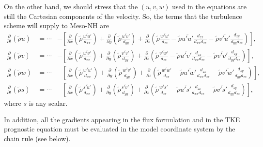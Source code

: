 On the other hand, we should stress that the $(u,v,w)$ used in the equations
are still the Cartesian components of the velocity.
So, the terms that the turbulence scheme will supply to Meso-NH are
\begin{eqnarray}
\frac{\partial }{\partial t}(\tilde{\rho}u)&=
\cdots&-\left[\frac{\partial}{\partial \overline{x}}(\tilde{\rho}
\frac{\overline{u'u'}}{d_{xx}})+\frac{\partial}{\partial \overline{y}}(\tilde
{\rho}\frac{\overline{u'v'}}{d_{yy}})+
\frac{\partial}{\partial \overline{z}}(\tilde{\rho}\frac{\overline{w'u'}}
{d_{zz}}-\tilde{\rho}\overline{u'u'}\frac{d_{zx}}{d_{xx}d_{zz}}
-\tilde{\rho}\overline{v'u'}\frac{d_{zy}}{d_{yy}d_{zz}}) \right ],\nonumber\\
\frac{\partial }{\partial t}(\tilde{\rho}v)&=
\cdots&-\left[\frac{\partial}{\partial \overline{x}}(\tilde{\rho}
\frac{\overline{u'v'}}{d_{xx}})+\frac{\partial}{\partial \overline{y}}(\tilde
{\rho}\frac{\overline{v'v'}}{d_{yy}})+
\frac{\partial}{\partial \overline{z}}(\tilde{\rho}\frac{\overline{v'w'}}
{d_{zz}}-\tilde{\rho}\overline{u'v'}\frac{d_{zx}}{d_{xx}d_{zz}}
-\tilde{\rho}\overline{v'v'}\frac{d_{zy}}{d_{yy}d_{zz}}) \right ],\nonumber\\
\frac{\partial }{\partial t}(\tilde{\rho}w)&=
\cdots&-\left[\frac{\partial}{\partial \overline{x}}(\tilde{\rho}
\frac{\overline{w'u'}}{d_{xx}})+\frac{\partial}{\partial \overline{y}}(\tilde
{\rho}\frac{\overline{w'v'}}{d_{yy}})+
\frac{\partial}{\partial \overline{z}}(\tilde{\rho}\frac{\overline{w'w'}}
{d_{zz}}-\tilde{\rho}\overline{u'w'}\frac{d_{zx}}{d_{xx}d_{zz}}
-\tilde{\rho}\overline{v'w'}\frac{d_{zy}}{d_{yy}d_{zz}}) \right ],\nonumber \\
\frac{\partial }{\partial t}(\tilde{\rho}s)&=
\cdots&-\left[\frac{\partial}{\partial \overline{x}}(\tilde{\rho}
\frac{\overline{s'u'}}{d_{xx}})+\frac{\partial}{\partial \overline{y}}(\tilde
{\rho}\frac{\overline{s'v'}}{d_{yy}})+
\frac{\partial}{\partial \overline{z}}(\tilde{\rho}\frac{\overline{w's'}}
{d_{zz}}-\tilde{\rho}\overline{u's'}\frac{d_{zx}}{d_{xx}d_{zz}}
-\tilde{\rho}\overline{v's'}\frac{d_{zy}}{d_{yy}d_{zz}}) \right ],\nonumber
\end{eqnarray}
where $s$ is any scalar.

In addition, all the gradients appearing in the flux formulation and in the
TKE prognostic equation must be evaluated in the model coordinate system by
the chain rule (see below).


